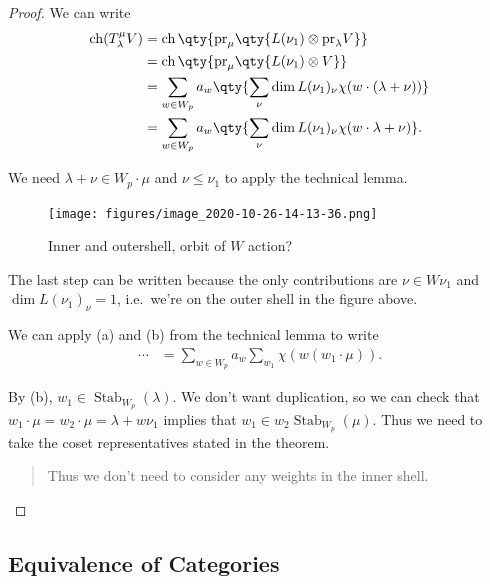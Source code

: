 \begin{proof}

We can write
\begin{align*}  
\operatorname{ch}(T_\lambda^\mu V)
&= \operatorname{ch}\qty{{\operatorname{pr}}_\mu\qty{L(\nu_1) \otimes{\operatorname{pr}}_\lambda V } } \\
&= \operatorname{ch}\qty{{\operatorname{pr}}_\mu\qty{L(\nu_1) \otimes V } } \\
&= \sum_{w\in W_p} a_w \qty{\sum_\nu \dim L(\nu_1)_\nu \chi(w\cdot(\lambda + \nu)) }\\
&= \sum_{w\in W_p} a_w  \qty{ \sum_\nu \dim L(\nu_1)_\nu \chi(w\cdot\lambda + \nu)  }
.\end{align*}

We need \(\lambda + \nu\in W_p\cdot \mu\) and \(\nu \leq \nu_1\) to
apply the technical lemma.

\begin{figure}
\centering
\texttt{[image: figures/image\_2020-10-26-14-13-36.png]}
\caption{Inner and outershell, orbit of \(W\) action?}
\end{figure}

The last step can be written because the only contributions are
\(\nu \in W\nu_1\) and \(\dim L(\nu_1)_\nu = 1\), i.e.~we're on the
outer shell in the figure above.

We can apply (a) and (b) from the technical lemma to write
\begin{align*}  
\cdots 
&= \sum_{w\in W_p} a_w \sum_{w_1} \chi(w(w_1\cdot \mu))
.\end{align*}

By (b), \(w_1 \in {\operatorname{Stab}}_{W_p}(\lambda)\). We don't want
duplication, so we can check that
\(w_1\cdot\mu = w_2 \cdot\mu = \lambda+ w\nu_1\) implies that
\(w_1 \in w_2 {\operatorname{Stab}}_{W_p}(\mu)\). Thus we need to take
the coset representatives stated in the theorem.

\begin{quote}
Thus we don't need to consider any weights in the inner shell.
\end{quote}

\end{proof}

\hypertarget{equivalence-of-categories}{%
\subsection{Equivalence of Categories}\label{equivalence-of-categories}}

